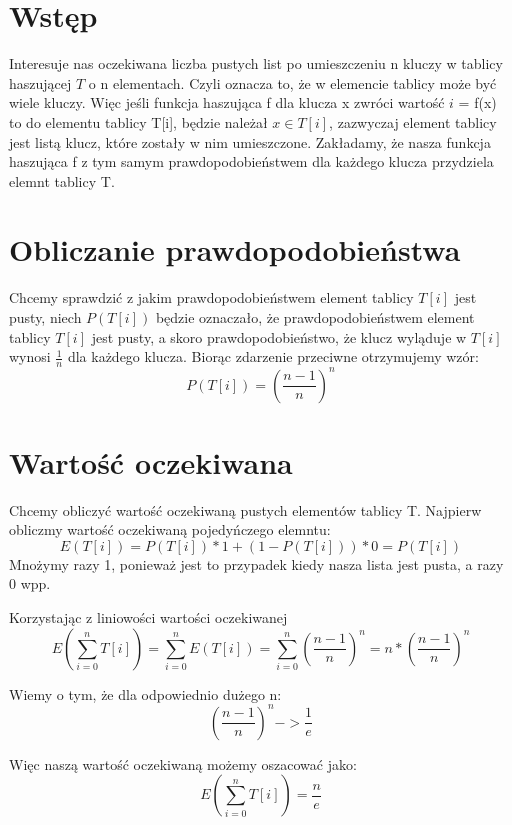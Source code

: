 \documentclass[12pt,a4paper]{article}
\begin{document}
\section{Wstęp}
Interesuje nas oczekiwana liczba pustych list po umieszczeniu n kluczy w tablicy haszującej $T$ o n elementach. Czyli oznacza to, że w elemencie tablicy może być wiele kluczy. Więc jeśli funkcja haszująca f dla klucza x zwróci wartość $i$ = f(x) to do elementu tablicy T[i], będzie należał $x \in T[i]$, zazwyczaj element tablicy jest listą klucz, które zostały w nim umieszczone. Zakładamy, że nasza funkcja haszująca f z tym samym prawdopodobieństwem dla każdego klucza przydziela elemnt tablicy T.

\section{Obliczanie prawdopodobieństwa}
Chcemy sprawdzić z jakim prawdopodobieństwem element tablicy $T[i]$ jest pusty, niech $P(T[i])$ będzie oznaczało, że prawdopodobieństwem element tablicy $T[i]$ jest pusty, a skoro prawdopodobieństwo, że klucz wyląduje w $T[i]$ wynosi $\frac{1}{n}$ dla każdego klucza. Biorąc zdarzenie przeciwne otrzymujemy wzór:
$$ P(T[i]) = (\frac{n-1}{n})^n$$
\section{Wartość oczekiwana}
Chcemy obliczyć wartość oczekiwaną pustych elementów tablicy T. Najpierw obliczmy wartość oczekiwaną pojedyńczego elemntu:
$$ E(T[i]) = P(T[i]) * 1 + (1 - P(T[i])) * 0 = P(T[i])$$
Mnożymy razy 1, ponieważ jest to przypadek kiedy nasza lista jest pusta, a razy 0 wpp.


Korzystając z liniowości wartości oczekiwanej
$$ E(\sum_{i=0}^n T[i]) = \sum_{i=0}^n E(T[i]) = \sum_{i=0}^n (\frac{n-1}{n})^n = n * (\frac{n-1}{n})^n $$

Wiemy o tym, że dla odpowiednio dużego n:
$$(\frac{n-1}{n})^n -> \frac{1}{e}$$

Więc naszą wartość oczekiwaną możemy oszacować jako:
$$ E(\sum_{i=0}^n T[i]) = \frac{n}{e}$$
\end{document}
